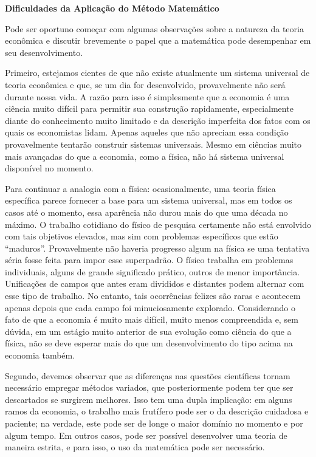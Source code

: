 \documentclass[a4paper,12pt]{article}[abntex2]
\begin{document}
\textbf{Dificuldades da Aplicação do Método Matemático}


Pode ser oportuno começar com algumas observações sobre a natureza da teoria econômica e discutir brevemente o papel que a matemática pode desempenhar em seu desenvolvimento.

Primeiro, estejamos cientes de que não existe atualmente um sistema universal de teoria econômica e que, se um dia for desenvolvido, provavelmente não será durante nossa vida. A razão para isso é simplesmente que a economia é uma ciência muito difícil para permitir sua construção rapidamente, especialmente diante do conhecimento muito limitado e da descrição imperfeita dos fatos com os quais os economistas lidam. Apenas aqueles que não apreciam essa condição provavelmente tentarão construir sistemas universais. Mesmo em ciências muito mais avançadas do que a economia, como a física, não há sistema universal disponível no momento.

Para continuar a analogia com a física: ocasionalmente, uma teoria física específica parece fornecer a base para um sistema universal, mas em todos os casos até o momento, essa aparência não durou mais do que uma década no máximo. O trabalho cotidiano do físico de pesquisa certamente não está envolvido com tais objetivos elevados, mas sim com problemas específicos que estão “maduros”. Provavelmente não haveria progresso algum na física se uma tentativa séria fosse feita para impor esse superpadrão. O físico trabalha em problemas individuais, alguns de grande significado prático, outros de menor importância. Unificações de campos que antes eram divididos e distantes podem alternar com esse tipo de trabalho. No entanto, tais ocorrências felizes são raras e acontecem apenas depois que cada campo foi minuciosamente explorado. Considerando o fato de que a economia é muito mais difícil, muito menos compreendida e, sem dúvida, em um estágio muito anterior de sua evolução como ciência do que a física, não se deve esperar mais do que um desenvolvimento do tipo acima na economia também.

Segundo, devemos observar que as diferenças nas questões científicas tornam necessário empregar métodos variados, que posteriormente podem ter que ser descartados se surgirem melhores. Isso tem uma dupla implicação: em alguns ramos da economia, o trabalho mais frutífero pode ser o da descrição cuidadosa e paciente; na verdade, este pode ser de longe o maior domínio no momento e por algum tempo. Em outros casos, pode ser possível desenvolver uma teoria de maneira estrita, e para isso, o uso da matemática pode ser necessário.
\end{document}
